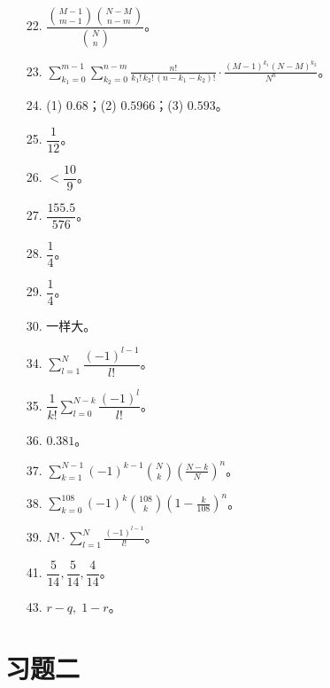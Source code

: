 \documentclass[../main.tex]{subfiles}
\begin{document}
\begin{enumerate}
\item[22.] $\dfrac{\binom{M-1}{m-1}\binom{N-M}{n-m}}{\binom{N}{n}}$。
\item[23.] $\displaystyle\sum_{k_1=0}^{m-1}\sum_{k_2=0}^{n-m}\frac{n!}{k_1!\,k_2!\,(n-k_1-k_2)!}\cdot\frac{(M-1)^{k_1}(N-M)^{k_2}}{N^{n}}$。
\item[24.] (1) $0.68$；(2) $0.5966$；(3) $0.593$。
\item[25.] $\dfrac{1}{12}$。
\item[26.] $<\dfrac{10}{9}$。
\item[27.] $\dfrac{155.5}{576}$。
\item[28.] $\dfrac{1}{4}$。
\item[29.] $\dfrac{1}{4}$。
\item[30.] 一样大。
\item[34.] $\displaystyle\sum_{l=1}^{N}\dfrac{(-1)^{l-1}}{l!}$。
\item[35.] $\dfrac{1}{k!}\displaystyle\sum_{l=0}^{N-k}\dfrac{(-1)^{l}}{l!}$。
\item[36.] $0.381$。
\item[37.] $\displaystyle\sum_{k=1}^{N-1}(-1)^{k-1}\binom{N}{k}\left(\frac{N-k}{N}\right)^{n}$。
\item[38.] $\displaystyle\sum_{k=0}^{108}(-1)^{k}\binom{108}{k}\left(1-\frac{k}{108}\right)^{n}$。
\item[39.] $N!\cdot\displaystyle\sum_{l=1}^{N}\frac{(-1)^{l-1}}{l!}$。
\item[41.] $\dfrac{5}{14},\dfrac{5}{14},\dfrac{4}{14}$。
\item[43.] $r-q,\;1-r$。
\end{enumerate}

\section*{习题二}
\end{document}
